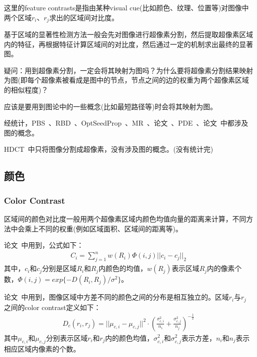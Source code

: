 \documentclass[12pt]{article}
\begin{document}
这里的feature contrasts是指由某种visual cue(比如颜色、纹理、位置等)对图像中两个区域$r_i$、$r_j$求出的区域间对比度。

基于区域的显著性检测方法一般会先对图像进行超像素分割，然后提取超像素区域内的特征，再根据特征计算区域间的对比度，然后通过一定的机制求出最终的显著图。

疑问：用到超像素分割，一定会将其映射为图吗？为什么要将超像素分割结果映射为图(即每个超像素被看成是图中的节点，节点之间的边的权重为两个超像素区域的相似程度)？

应该是要用到图论中的一些概念(比如最短路径等)时会将其映射为图。

经统计，PBS~\cite{yang2013graph}、RBD~\cite{zhu2014saliency}、OptSeedProp~\cite{lu2014learning}、MR~\cite{yang2013saliency}、论文~\cite{mairon2014closer}、PDE~\cite{liu2014adaptive}、论文~\cite{yan2013hierarchical}中都涉及图的概念。

HDCT~\cite{kim2014salient}中只将图像分割成超像素，没有涉及图的概念。(没有统计完)

\subsection{颜色}

\subsubsection{Color Contrast}

区域间的颜色对比度一般用两个超像素区域内颜色均值向量的距离来计算，不同方法中会乘上不同的权重(例如区域面积、区域间的距离等)。

论文~\cite{yan2013hierarchical}中用到，公式如下：
\begin{align}
C_i = \sum_{j=1}^{n}w(R_i)\Phi(i, j)||c_i-c_j||_2
\end{align}
其中，$c_i$和$c_j$分别是区域$R_i$和$R_j$内颜色的均值，$w(R_j)$表示区域$R_j$内的像素个数，$\Phi(i, j) = exp\{ -D(R_i, R_j)/\sigma^2\}$。

论文~\cite{zhu2014tag}中用到，图像区域中方差不同的颜色之间的分布是相互独立的。区域$r_i$与$r_j$之间的color contrast定义如下：
\begin{align}
D_c(r_i, r_j) = ||\mu_{c, i}-\mu_{c, j}||^2\cdot \left(\frac{\sigma_{c, i}^2}{n_i}+\frac{\sigma_{c, j}^2}{n_j}\right)^{-\frac{1}{2}}
\end{align}
其中$\mu_{c, i}$和$\mu_{c, j}$分别表示区域$r_i$和$r_j$内的颜色均值，$\sigma_{c, i}^2$和$\sigma_{c, j}^2$表示方差，$n_i$和$n_j$表示相应区域内像素的个数。
\end{document}
